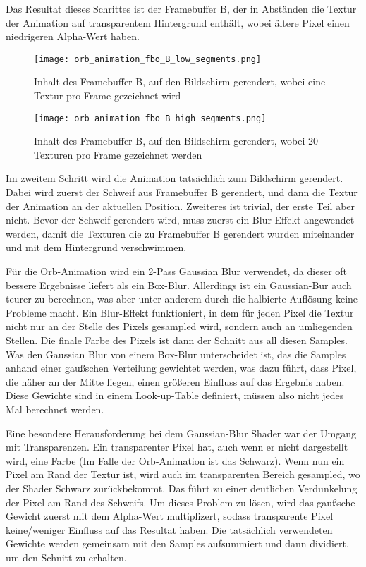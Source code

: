 Das Resultat dieses Schrittes ist der Framebuffer B, der in Abständen die Textur der Animation auf transparentem
Hintergrund enthält, wobei ältere Pixel einen niedrigeren Alpha-Wert haben.

\begin{figure}[H]
    \centering
    \texttt{[image: orb\_animation\_fbo\_B\_low\_segments.png]}
    \caption{Inhalt des Framebuffer B, auf den Bildschirm gerendert, wobei eine Textur pro Frame gezeichnet wird }
\end{figure}

\begin{figure}[H]
    \centering
    \texttt{[image: orb\_animation\_fbo\_B\_high\_segments.png]}
    \caption{Inhalt des Framebuffer B, auf den Bildschirm gerendert, wobei 20 Texturen pro Frame gezeichnet werden }
\end{figure}

Im zweitem Schritt wird die Animation tatsächlich zum Bildschirm gerendert.
Dabei wird zuerst der Schweif aus Framebuffer B gerendert, und dann die Textur der Animation an der aktuellen Position.
Zweiteres ist trivial, der erste Teil aber nicht.
Bevor der Schweif gerendert wird, muss zuerst ein Blur-Effekt angewendet werden, damit die Texturen die zu Framebuffer
B gerendert wurden miteinander und mit dem Hintergrund verschwimmen.

Für die Orb-Animation wird ein 2-Pass Gaussian Blur verwendet, da dieser oft bessere Ergebnisse liefert als \zB ein
Box-Blur.\cite{gaussianBlur}
Allerdings ist ein Gaussian-Bur auch teurer zu berechnen, was aber unter anderem durch die halbierte Auflösung keine
Probleme macht.
Ein Blur-Effekt funktioniert, in dem für jeden Pixel die Textur nicht nur an der Stelle des Pixels gesampled wird,
sondern auch an umliegenden Stellen.
Die finale Farbe des Pixels ist dann der Schnitt aus all diesen Samples.
Was den Gaussian Blur von \ua einem Box-Blur unterscheidet ist, das die Samples anhand einer gaußschen Verteilung
gewichtet werden, was dazu führt, dass Pixel, die näher an der Mitte liegen, einen größeren Einfluss auf das Ergebnis
haben.\cite{gaussianBlur}
Diese Gewichte sind in einem Look-up-Table definiert, müssen also nicht jedes Mal berechnet werden.

Eine besondere Herausforderung bei dem Gaussian-Blur Shader war der Umgang mit Transparenzen.
Ein transparenter Pixel hat, auch wenn er nicht dargestellt wird, eine Farbe (Im Falle der Orb-Animation ist das Schwarz).
Wenn nun ein Pixel am Rand der Textur ist, wird auch im transparenten Bereich gesampled,
wo der Shader Schwarz zurückbekommt.
Das führt zu einer deutlichen Verdunkelung der Pixel am Rand des Schweifs.
Um dieses Problem zu lösen, wird das gaußsche Gewicht zuerst mit dem Alpha-Wert multiplizert, sodass transparente Pixel
keine/weniger Einfluss auf das Resultat haben.
Die tatsächlich verwendeten Gewichte werden gemeinsam mit den Samples aufsummiert und dann dividiert, um den Schnitt zu
erhalten.

